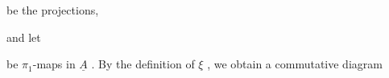 \begin{center}
\end{center}
be the projections,

and let

\begin{center}
\end{center}
be $\pi_1$-maps in $\underline{A}$ . By the definition of $\xi$ , we obtain a commutative diagram

